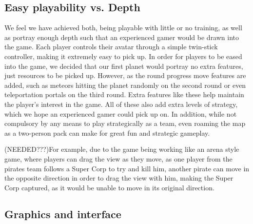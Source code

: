 \documentclass[11pt,a4paper]{article}
\begin{document}
      \subsection{Easy playability vs. Depth}
      We feel we have achieved both, being playable with little or no training, as well as portray enough depth such that an experienced gamer would be drawn into the game. Each player controls their avatar through a simple twin-stick controller, making it extremely easy to pick up. In order for players to be eased into the game, we decided that our first planet would portray no extra features, just resources to be picked up. However, as the round progress move features are added, such as meteors hitting the planet randomly on the second round or even teleportation portals on the third round. Extra features like these help maintain the player's interest in the game. All of these also add extra levels of strategy, which we hope an experienced gamer could pick up on. In addition, while not compulsory by any means to play strategically as a team, even roaming the map as a two-person pack can make for great fun and strategic gameplay. 
      
      (NEEDED???)For example, due to the game being working like an arena style game, where players can drag the view as they move, as one player from the pirates team follows a Super Corp to try and kill him, another pirate can move in the opposite direction in order to drag the view with him, making the Super Corp captured, as it would be unable to move in its original direction. 



       \subsection{Graphics and interface}
\end{document}
